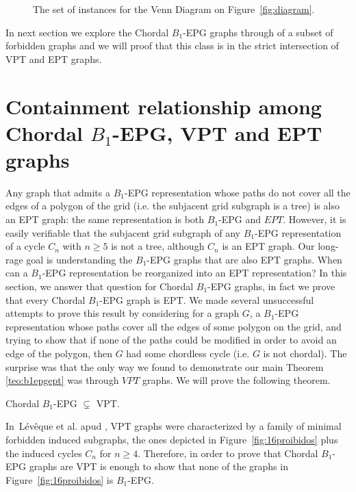 \documentclass{dmgt}
\begin{document}
\begin{figure}[htb]
\begin{tabular}{  c c c c }
  \end{tabular}
 \caption{The set of instances for the Venn Diagram %
 on  Figure~\ref{fig:diagram}.}
 \label{fig:exemplosDiagram}
\end{figure}  
 

In next section we explore the Chordal $B_1$-EPG graphs through of a subset of forbidden graphs and we will proof that this class is in the strict intersection of VPT and EPT graphs.



\section{Containment relationship among Chordal $B_1$-EPG, VPT and EPT graphs }


 Any graph that
admits a $B_1$-EPG representation  whose paths do not cover all the edges of a polygon of the grid (i.e.
the subjacent grid subgraph is a tree)  is also an EPT graph: the same representation is both $B_1$-EPG and $EPT$.
However, it is easily verifiable that the subjacent grid subgraph of any $B_1$-EPG representation of a cycle $C_n$ with $n\geq 5$ is not a tree,
although $C_n$ is an  EPT graph.  Our long-rage goal is 
understanding the $B_1$-EPG graphs that are also EPT graphs. When can a $B_1$-EPG representation
be reorganized into an EPT representation?  In this section,
 we answer that question for Chordal $B_1$-EPG graphs, in fact we prove that every Chordal $B_1$-EPG graph is EPT. We
 made several unsuccessful attempts to prove this result by considering for a graph $G$, a $B_1$-EPG representation whose paths cover all the edges
 of some polygon on the grid, and trying  to show  that if none of the paths could be modified in order to avoid an edge of the polygon,
 then $G$ had some chordless  cycle (i.e. $G$ is not chordal). The surprise was that the only way we found to demonstrate our main Theorem \ref{teo:b1epgept} was through $VPT$ graphs.
 We will prove the following theorem.

\begin{theorem}\label{teo:chordalB1inVPT}
Chordal $B_1$-EPG $\subsetneq$ VPT. 
\end{theorem}

In~L{\'e}v{\^e}que et al. \cite{leveque2009characterizing} apud \cite{alcon2015characterizing},  VPT graphs were characterized by a family of minimal forbidden induced subgraphs,
the ones depicted in 
Figure~\ref{fig:16proibidos} plus the induced cycles $C_n$ for $n\geq 4$. Therefore, in order to prove
that Chordal $B_1$-EPG graphs are VPT is enough to show that none of the graphs in Figure~\ref{fig:16proibidos} 
is $B_1$-EPG. %
\end{document}
